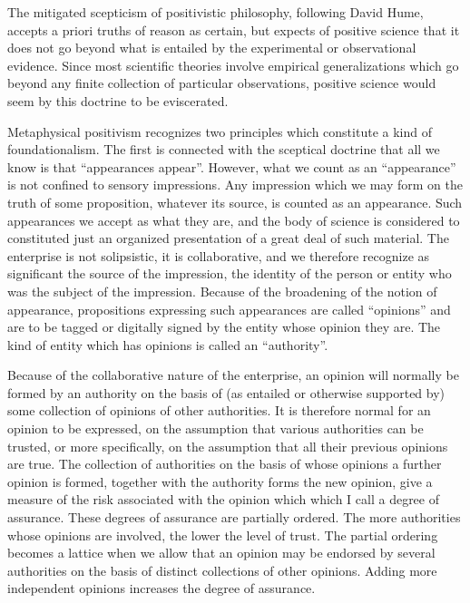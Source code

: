 The mitigated scepticism of positivistic philosophy, following David
Hume, accepts a priori truths of reason as certain, but expects of
positive science that it does not go beyond what is entailed by the
experimental or observational evidence.
Since most scientific theories involve empirical generalizations which
go beyond any finite collection of particular observations, positive
science would seem by this doctrine to be eviscerated.

Metaphysical positivism recognizes two principles which constitute a
kind of foundationalism.
The first is connected with the sceptical doctrine that all we know is
that ``appearances appear''.
However, what we count as an ``appearance'' is not confined to sensory
impressions.
Any impression which we may form on the truth of some proposition,
whatever its source, is counted as an appearance.
Such appearances we accept as what they are, and the body of science
is considered to constituted just an organized presentation of a great
deal of such material.
The enterprise is not solipsistic, it is collaborative, and we
therefore recognize as significant the source of the impression, the
identity of the person or entity who was the subject of the
impression.
Because of the broadening of the notion of appearance, propositions
expressing such appearances are called ``opinions'' and are to be
tagged or digitally signed by the entity whose opinion they are.
The kind of entity which has opinions is called an ``authority''.

Because of the collaborative nature of the enterprise, an opinion will
normally be formed by an authority on the basis of (as entailed or
otherwise supported by) some collection of opinions of other authorities.
It is therefore normal for an opinion to be expressed, on the
assumption that various authorities can be trusted, or more
specifically, on the assumption that all their previous opinions are
true.
The collection of authorities on the basis of whose opinions a further
opinion is formed, together with the authority forms the new opinion,
give a measure of the risk associated with the opinion which which I
call a degree of assurance.
These degrees of assurance are partially ordered.
The more authorities whose opinions are involved, the lower the level
of trust.
The partial ordering becomes a lattice when we allow that an opinion
may be endorsed by several authorities on the basis of distinct
collections of other opinions.
Adding more independent opinions increases the degree of assurance.

